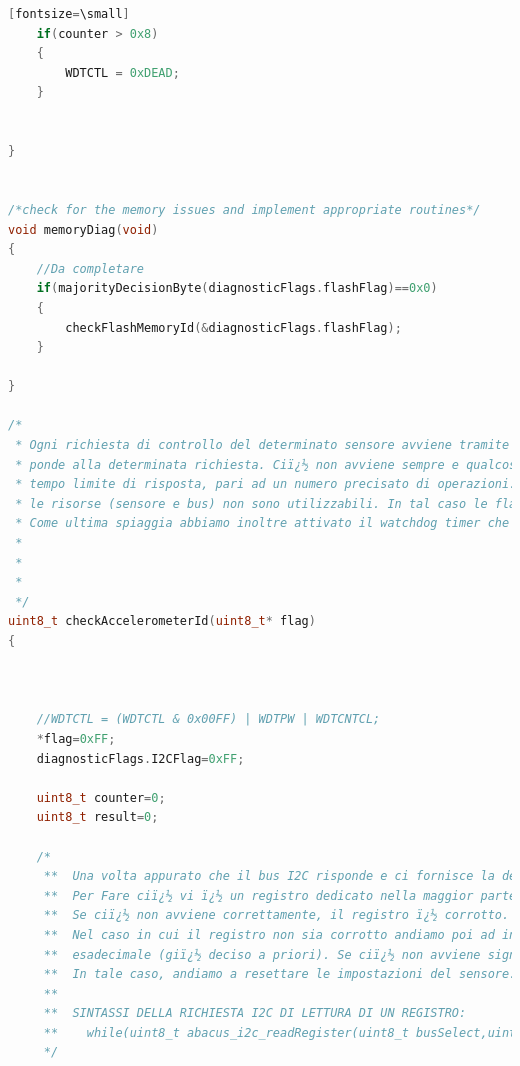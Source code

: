 \documentclass[LaM,binding=0.6cm]{../sapthesis}
\begin{document}
\begin{lstlisting}[language=c][fontsize=\small]
    if(counter > 0x8)
    {                                             
        WDTCTL = 0xDEAD;
    }


}


/*check for the memory issues and implement appropriate routines*/
void memoryDiag(void)
{
    //Da completare
    if(majorityDecisionByte(diagnosticFlags.flashFlag)==0x0)
    {
        checkFlashMemoryId(&diagnosticFlags.flashFlag);
    }

}

/*
 * Ogni richiesta di controllo del determinato sensore avviene tramite protocollo I2C. Questo protocollo si svolge in due parti: prima si richiede la determinata risorsa, poi il sensore ris
 * ponde alla determinata richiesta. Ciï¿½ non avviene sempre e qualcosa puï¿½ andare storto (sensore rotto, bus I2C non funzionante). Per evitare che il codice si blocchi imponiamo quindi un
 * tempo limite di risposta, pari ad un numero precisato di operazioni. Se il contatore raggiunge il limite, significa che il bus non risponde e di conseguenza bisogna supporre che entrambe
 * le risorse (sensore e bus) non sono utilizzabili. In tal caso le flag a byte rimangono alte e dopo un software reset obbligato le risorse vengono escluse o il problema viene risolto.
 * Come ultima spiaggia abbiamo inoltre attivato il watchdog timer che ci permette di non bloccare il codice nel caso in cui tutta la procedura venga bloccata da un evento inaspettato.
 *
 *
 *
 */
uint8_t checkAccelerometerId(uint8_t* flag)
{



    //WDTCTL = (WDTCTL & 0x00FF) | WDTPW | WDTCNTCL;
    *flag=0xFF;
    diagnosticFlags.I2CFlag=0xFF;

    uint8_t counter=0;
    uint8_t result=0;

    /*
     **  Una volta appurato che il bus I2C risponde e ci fornisce la determinata risorsa, bisogna valutare che i registri non siano corrotti.
     **  Per Fare ciï¿½ vi ï¿½ un registro dedicato nella maggior parte dei sensori chiamato "Device ID" che ci permette di leggere il nome del sensore.
     **  Se ciï¿½ non avviene correttamente, il registro ï¿½ corrotto.
     **  Nel caso in cui il registro non sia corrotto andiamo poi ad indagare il registro di configurazione, il quale deve essere impostato secondo un determinato valore
     **  esadecimale (giï¿½ deciso a priori). Se ciï¿½ non avviene significa che qualcosa ï¿½ cambiato e ciï¿½ ï¿½ inaspettato.
     **  In tale caso, andiamo a resettare le impostazioni del sensore.
     **
     **  SINTASSI DELLA RICHIESTA I2C DI LETTURA DI UN REGISTRO:
     **    while(uint8_t abacus_i2c_readRegister(uint8_t busSelect,uint8_t address, uint8_t reg)
     */



\end{lstlisting}
\end{document}
